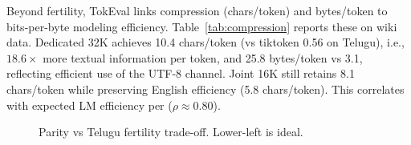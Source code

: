 \documentclass[conference]{IEEEtran}
\begin{document}
Beyond fertility, TokEval links compression (chars/token) and bytes/token to bits-per-byte modeling efficiency. Table~\ref{tab:compression} reports these on wiki data. Dedicated 32K achieves 10.4 chars/token (vs tiktoken 0.56 on Telugu), i.e., $18.6\times$ more textual information per token, and 25.8 bytes/token vs 3.1, reflecting efficient use of the UTF-8 channel. Joint 16K still retains 8.1 chars/token while preserving English efficiency (5.8 chars/token). This correlates with expected LM efficiency per \cite{meister2026tokeval} ($\rho\approx0.80$).

\begin{table}[t]
\centering
\footnotesize
\setlength{\tabcolsep}{3pt}
\caption{Compression and byte efficiency on 2K Telugu wiki sample. Higher chars/token = better channel use.}
\label{tab:compression}
\end{table}

\begin{figure}[t]
\centering
{}
\caption{Parity vs Telugu fertility trade-off. Lower-left is ideal.}
\label{fig:parity}
\end{figure}
\end{document}
